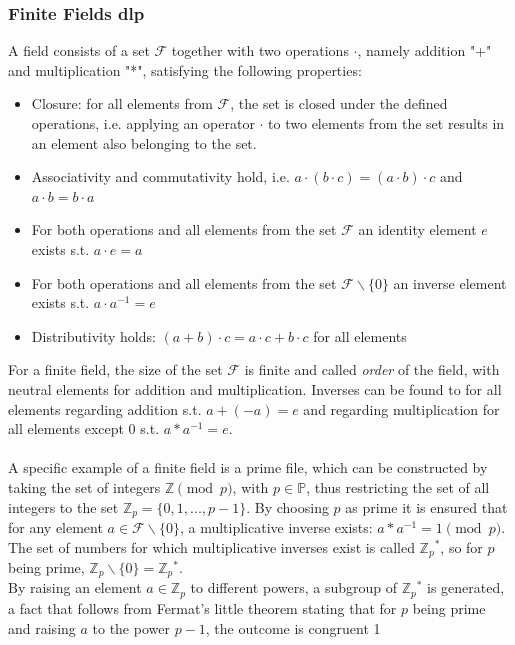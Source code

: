 \subsubsection{Finite Fields \gls{dlp}}
A field consists of a set $\mathcal{F}$ together with two operations $\cdot$, namely addition "+" and multiplication "*", satisfying the following properties:
\begin{itemize}
 \item  Closure: for all elements from $\mathcal{F}$, the set is closed under the defined operations, i.e. applying an operator $\cdot$ to two elements from the set results in an
element also belonging to the set.
 \item Associativity and commutativity hold, i.e. $a \cdot (b \cdot c) = (a \cdot b) \cdot c$ and $a \cdot b = b \cdot a$
 \item For both operations and all elements from the set $\mathcal{F}$ an identity element $e$ exists s.t. $a\cdot e = a$
 \item For both operations and all elements from the set $\mathcal{F} \backslash \{0\}$ an inverse element exists s.t. $a\cdot a^{-1} = e$
 \item Distributivity holds: $(a+b) \cdot c = a \cdot c + b \cdot c$ for all elements 
\end{itemize}
For a finite field, the size of the set 
$\mathcal{F}$ is finite and called \textit{order} of the field, with neutral elements for addition and
multiplication. Inverses can be found to for all
elements regarding addition s.t. $a + (-a) = e$ and regarding multiplication for all elements except ${0}$ s.t. $a * a^{-1} = e$.
\\
\\
A specific example of a finite field is a prime file, which can be constructed by taking the set of integers $\mathbb{Z}\pmod p$, with $p \in \mathbb{P}$, thus
restricting the set of all integers to the set $\mathbb{Z}_p = \{0, 1, ..., p-1\}$.
By choosing $p$ as prime it is ensured that for any element $a \in \mathcal{F} \backslash\{0\}$, a multiplicative inverse exists: $ a * a^{-1} = 1 \pmod p$.
The set of numbers for which multiplicative inverses exist is called $\mathbb{Z}{_p}^*$, so for $p$ being prime, $\mathbb{Z}_p \backslash \{0\} = \mathbb{Z}{_p}^*$.
\\
By raising an element $a \in \mathbb{Z}_p$ to different powers, a subgroup of $\mathbb{Z}{_p}^*$
is generated, a fact that follows from Fermat's little theorem stating that for $p$ being prime and raising $a$ to the power $p-1$, the outcome is congruent 1
